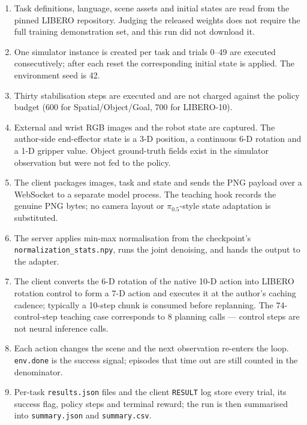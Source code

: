 \begin{enumerate}
  \item Task definitions, language, scene assets and initial states are read
        from the pinned LIBERO repository. Judging the released weights does not
        require the full training demonstration set, and this run did not
        download it.
  \item One simulator instance is created per task and trials 0--49 are executed
        consecutively; after each reset the corresponding initial state is
        applied. The environment seed is 42.
  \item Thirty stabilisation steps are executed and are not charged against the
        policy budget (600 for Spatial/Object/Goal, 700 for LIBERO-10).
  \item External and wrist RGB images and the robot state are captured. The
        author-side end-effector state is a 3-D position, a continuous 6-D
        rotation and a 1-D gripper value. Object ground-truth fields exist in
        the simulator observation but were not fed to the policy.
  \item The client packages images, task and state and sends the PNG payload
        over a WebSocket to a separate model process. The teaching hook records
        the genuine PNG bytes; no camera layout or $\pi_{0.5}$-style state
        adaptation is substituted.
  \item The server applies min-max normalisation from the checkpoint's
        \texttt{normalization\_stats.npy}, runs the joint denoising, and hands
        the output to the adapter.
  \item The client converts the 6-D rotation of the native 10-D action into
        LIBERO rotation control to form a 7-D action and executes it at the
        author's caching cadence; typically a 10-step chunk is consumed before
        replanning. The 74-control-step teaching case corresponds to 8 planning
        calls --- control steps are not neural inference calls.
  \item Each action changes the scene and the next observation re-enters the
        loop. \texttt{env.done} is the success signal; episodes that time out are
        still counted in the denominator.
  \item Per-task \texttt{results.json} files and the client \texttt{RESULT} log
        store every trial, its success flag, policy steps and terminal reward;
        the run is then summarised into \texttt{summary.json} and
        \texttt{summary.csv}.
\end{enumerate}

